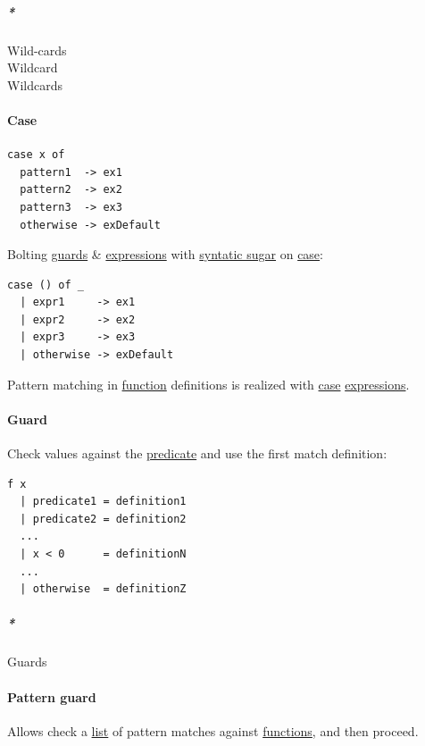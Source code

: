 \documentclass[11pt]{article}
\begin{document}
\subparagraph{\emph{*}}
\label{sec:org3473cdd}
\label{org4a08590}Wild-cards\\
\label{orgc7ff37d}Wildcard\\
\label{org76ccb11}Wildcards\\

\paragraph{\label{org96bceb0}Case}
\label{sec:org8d91322}
\begin{verbatim}
case x of
  pattern1  -> ex1
  pattern2  -> ex2
  pattern3  -> ex3
  otherwise -> exDefault
\end{verbatim}

Bolting \hyperref[orge8adc07]{guards} \& \hyperref[org9eb2c72]{expressions} with \hyperref[orgca01751]{syntatic sugar} on \hyperref[org96bceb0]{case}:\\
\begin{verbatim}
case () of _
  | expr1     -> ex1
  | expr2     -> ex2
  | expr3     -> ex3
  | otherwise -> exDefault
\end{verbatim}

Pattern matching in \hyperref[orgeb5cddb]{function} definitions is realized with \hyperref[org96bceb0]{case} \hyperref[org9eb2c72]{expressions}.\\

\paragraph{\label{orgc7d30dc}Guard}
\label{sec:orge928b15}
Check values against the \hyperref[orgf52abe4]{predicate} and use the first match definition:\\

\begin{verbatim}
f x
  | predicate1 = definition1
  | predicate2 = definition2
  ...
  | x < 0      = definitionN
  ...
  | otherwise  = definitionZ
\end{verbatim}

\subparagraph{\emph{*}}
\label{sec:orga32057d}

\label{orge8adc07}Guards\\

\paragraph{\label{org5372f4f}Pattern guard}
\label{sec:org125bd21}
Allows check a \hyperref[org8ae0f28]{list} of pattern matches against \hyperref[org66c5288]{functions}, and then proceed.\\
\end{document}
